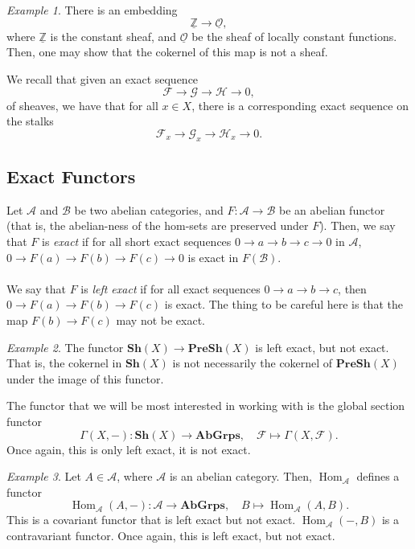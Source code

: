 \documentclass[a4paper]{report}
\theoremstyle{definition}
\theoremstyle{remark}
\theoremstyle{proposition}
\theoremstyle{conjecture}
\theoremstyle{lemma}
\theoremstyle{corollary}
\theoremstyle{exercise}
\theoremstyle{example}
\newtheorem{example}{Example}
\newcommand{\mcal}{\mathcal}
\newcommand{\on}{\operatorname}
\begin{document}
\begin{example}
    There is an embedding $$\underline{\mathbb{Z}} \longrightarrow \underline{\mcal{O}},$$
    where $\underline{\mathbb{Z}}$ is the constant sheaf, and 
    $\underline{\mcal{O}}$ be the sheaf of locally constant functions.
    Then, one may show that the cokernel of this map is not a sheaf.
\end{example}

We recall that given an exact sequence 
$$\mcal{F} \longrightarrow \mcal{G} \longrightarrow \mcal{H}\longrightarrow 0,$$
of sheaves, we have that for all $x\in X$, there is a corresponding exact
sequence on the stalks 
$$\mcal{F}_x \longrightarrow \mcal{G}_x \longrightarrow \mcal{H}_x \longrightarrow 0.$$

\subsection{Exact Functors}

Let $\mcal{A}$ and $\mcal{B}$ be two abelian categories, and $F : \mcal{A}\to\mcal{B}$ be an abelian functor (that is, the abelian-ness of the hom-sets are preserved under $F$). Then, we say that $F$ is \emph{exact} if 
for all short exact sequences $0\to a \to b \to c \to 0$ in $\mcal{A}$, 
$0\to F(a) \to F(b) \to F(c) \to 0$ is exact in $F(\mcal{B})$. \\\\
We say that $F$ is \emph{left exact} if for all exact sequences $0\to a \to b \to c$, then $0 \to F(a) \to F(b) \to F(c)$ is exact. 
The thing to be careful here is that the map $F(b) \to F(c)$ may not be 
exact.

\begin{example}
    The functor $\mathbf{Sh}(X) \to \mathbf{PreSh}(X)$ is left exact, 
    but not exact. That is, the cokernel in $\mathbf{Sh}(X)$ is not 
    necessarily the cokernel of $\mathbf{PreSh}(X)$ under the image 
    of this functor.
\end{example}

The functor that we will be most interested in working with is the global 
section functor 
$$\Gamma(X,-) : \mathbf{Sh}(X) \longrightarrow \mathbf{AbGrps},\quad \mcal{F} \longmapsto \Gamma(X,\mcal{F}).$$
Once again, this is only left exact, it is not exact. 

\begin{example}
    Let $A \in \mcal{A}$, where $\mcal{A}$ is an abelian category.
    Then, $\on{Hom}_\mcal{A}$ defines a functor
    $$\on{Hom}_\mcal{A}(A,-) : \mcal{A} \longrightarrow \mathbf{AbGrps},\quad B \longmapsto \on{Hom}_\mcal{A}(A,B).$$
    This is a covariant functor that is left exact but not exact.
    $\on{Hom}_\mcal{A}(-,B)$ is a contravariant functor. Once again, this 
    is left exact, but not exact.
\end{example}
\end{document}
